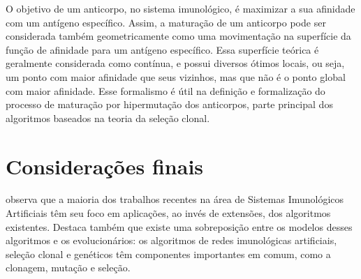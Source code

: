 O objetivo de um anticorpo, no sistema imunológico, é maximizar a sua afinidade com um antígeno específico. Assim, a maturação de um anticorpo pode ser considerada também geometricamente como uma movimentação na superfície da função de afinidade para um antígeno específico. Essa superfície teórica é geralmente considerada como contínua, e possui diversos ótimos locais, ou seja, um ponto com maior afinidade que seus vizinhos, mas que não é o ponto global com maior afinidade. Esse formalismo é útil na definição e formalização do processo de maturação por hipermutação dos anticorpos, parte principal dos algoritmos baseados na teoria da seleção clonal.

\section{Considerações finais}

\citet{Dasgupta2010} observa que a maioria dos trabalhos recentes na área de Sistemas Imunológicos Artificiais têm seu foco em aplicações, ao invés de extensões, dos algoritmos existentes. Destaca também que existe uma sobreposição entre os modelos desses algoritmos e os evolucionários: os algoritmos de redes imunológicas artificiais, seleção clonal e genéticos têm componentes importantes em comum, como a clonagem, mutação e seleção.
